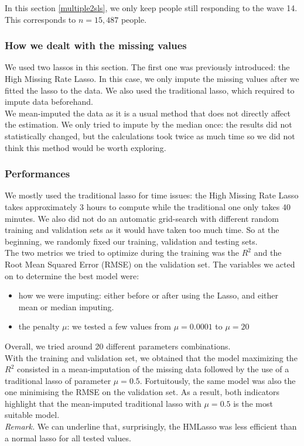 \documentclass[]{article}
\begin{document}
\noindent
In this section \ref{multiple2sls}, we only keep people still responding to the wave 14. This corresponds to $n=15,487$ people.

\subsubsection{How we dealt with the missing values}
We used two lassos in this section. The first one was previously introduced: the High Missing Rate Lasso. In this case, we only impute the missing values after we fitted the lasso to the data. We also used the traditional lasso, which required to impute data beforehand.\\

\noindent
We mean-imputed the data as it is a usual method that does not directly affect the estimation. We only tried to impute by the median once: the results did not statistically changed, but the calculations took twice as much time so we did not think this method would be worth exploring.

\subsubsection{Performances}
We mostly used the traditional lasso for time issues: the High Missing Rate Lasso takes approximately 3 hours to compute while the traditional one only takes 40 minutes. We also did not do an automatic grid-search with different random training and validation sets as it would have taken too much time. So at the beginning, we randomly fixed our training, validation and testing sets.\\

\noindent
The two metrics we tried to optimize during the training was the $R^2$ and the Root Mean Squared Error (RMSE) on the validation set. The variables we acted on to determine the best model were:
\begin{itemize}
	\item how we were imputing: either before or after using the Lasso, and either mean or median imputing.
	\item the penalty $\mu$: we tested a few values from $\mu = 0.0001$ to $\mu = 20$
\end{itemize}
Overall, we tried around 20 different parameters combinations.\\

\noindent
With the training and validation set, we obtained that the model maximizing the $R^2$ consisted in a mean-imputation of the missing data followed by the use of a traditional lasso of parameter $\mu = 0.5$. Fortuitously, the same model was also the one minimising the RMSE on the validation set. As a result, both indicators highlight that the mean-imputed traditional lasso with $\mu = 0.5$ is the most suitable model.\\
\textit{Remark.} We can underline that, surprisingly, the HMLasso was less efficient than a normal lasso for all tested values.\\
\end{document}
